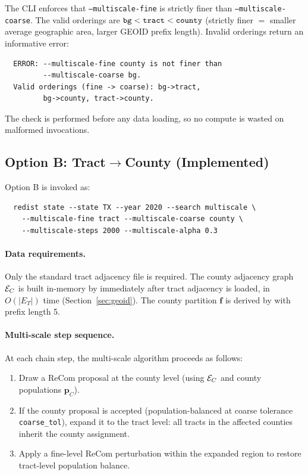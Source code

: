 The CLI enforces that \texttt{--multiscale-fine} is strictly finer than
\texttt{--multiscale-coarse}.
The valid orderings are $\texttt{bg} < \texttt{tract} < \texttt{county}$ (strictly finer
$=$ smaller average geographic area, larger GEOID prefix length).
Invalid orderings return an informative error:

\begin{verbatim}
  ERROR: --multiscale-fine county is not finer than
         --multiscale-coarse bg.
  Valid orderings (fine -> coarse): bg->tract,
         bg->county, tract->county.
\end{verbatim}

\noindent
The check is performed before any data loading, so no compute is wasted
on malformed invocations.

\subsection{Option B: Tract$\to$County (Implemented)}
\label{ssec:optionb}

Option B is invoked as:
\begin{verbatim}
  redist state --state TX --year 2020 --search multiscale \
    --multiscale-fine tract --multiscale-coarse county \
    --multiscale-steps 2000 --multiscale-alpha 0.3
\end{verbatim}

\paragraph{Data requirements.}
Only the standard tract adjacency file is required.
The county adjacency graph $\mathcal{E}_C$ is built in-memory by \buildc{}
immediately after tract adjacency is loaded, in $O(|E_T|)$ time
(Section~\ref{sec:geoid}).
The county partition $\mathbf{f}$ is derived by \derive{}
with prefix length 5.

\paragraph{Multi-scale step sequence.}
At each chain step, the multi-scale algorithm proceeds as follows:

\begin{enumerate}
  \item Draw a ReCom proposal at the county level (using $\mathcal{E}_C$ and
        county populations $\mathbf{p}_C$).
  \item If the county proposal is accepted (population-balanced at
        coarse tolerance \texttt{coarse\_tol}), expand it to the
        tract level: all tracts in the affected counties inherit
        the county assignment.
  \item Apply a fine-level ReCom perturbation within the expanded region
        to restore tract-level population balance.
\end{enumerate}

